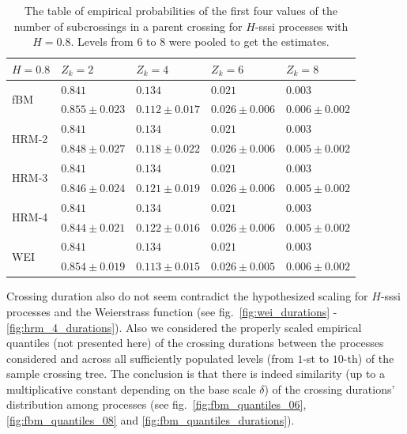 \documentclass[a4paper]{article}
\begin{document}
\begin{table}[h]\begin{center}
	\begin{tabular}{l||l|l|l|l|}
					$H=0.8$ & $Z_k = 2$ & $Z_k = 4$ & $Z_k = 6$ & $Z_k = 8$ \\ \hline\hline
	\multirow{2}{*}{fBM} 	& $0.841$ & $0.134$ & $0.021$ & $0.003$ \\ \cline{2-5}
 							& $0.855\pm0.023$ & $0.112\pm0.017$ & $0.026\pm0.006$ & $0.006\pm0.002$ \\ \hline\hline
	\multirow{2}{*}{HRM-2} 	& $0.841$ & $0.134$ & $0.021$ & $0.003$ \\ \cline{2-5}
 							& $0.848\pm0.027$ & $0.118\pm0.022$ & $0.026\pm0.006$ & $0.005\pm0.002$ \\ \hline\hline
	\multirow{2}{*}{HRM-3} 	& $0.841$ & $0.134$ & $0.021$ & $0.003$ \\ \cline{2-5}
 							& $0.846\pm0.024$ & $0.121\pm0.019$ & $0.026\pm0.006$ & $0.005\pm0.002$ \\ \hline\hline
	\multirow{2}{*}{HRM-4} 	& $0.841$ & $0.134$ & $0.021$ & $0.003$ \\ \cline{2-5}
 							& $0.844\pm0.021$ & $0.122\pm0.016$ & $0.026\pm0.006$ & $0.005\pm0.002$ \\ \hline\hline
	\multirow{2}{*}{WEI} 	& $0.841$ & $0.134$ & $0.021$ & $0.003$ \\ \cline{2-5}
 							& $0.854\pm0.019$ & $0.113\pm0.015$ & $0.026\pm0.005$ & $0.006\pm0.002$ \\ \hline\hline
	\end{tabular}
	\caption{The table of empirical probabilities of the first four values of the number
	of subcrossings in a parent crossing for $H$-sssi processes with $H=0.8$. Levels from
	6 to 8 were pooled to get the estimates.}
\label{tbl:empirical_probs_02}
\end{center}\end{table}

Crossing duration also do not seem contradict the hypothesized scaling for $H$-sssi
processes and the Weierstrass function (see fig.~\ref{fig:wei_durations} - \ref{fig:hrm_4_durations}).
Also we considered the properly scaled empirical quantiles (not presented here) of
the crossing durations between the processes considered and across all sufficiently
populated levels (from $1$-st to $10$-th) of the sample crossing tree. The conclusion
is that there is indeed similarity (up to a multiplicative constant depending on
the base scale $\delta$) of the crossing durations' distribution among processes
(see fig.~\ref{fig:fbm_quantiles_06}, \ref{fig:fbm_quantiles_08} and \ref{fig:fbm_quantiles_durations}).
\end{document}
